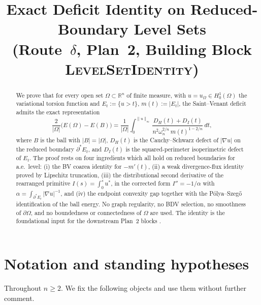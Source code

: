 \documentclass[11pt]{article}
\title{Exact Deficit Identity on Reduced-Boundary Level Sets\\
       (Route~$\delta$, Plan~2, Building Block \textsc{LevelSetIdentity})}
\author{}
\date{}
\theoremstyle{definition}
\newcommand{\R}{\mathbb{R}}
\newcommand{\Om}{\Omega}
\begin{document}
\maketitle

\begin{abstract}
We prove that for every open set $\Om\subset\R^{n}$ of finite measure, with
$u=u_{\Om}\in H^{1}_{0}(\Om)$ the variational torsion function and
$E_{t}:=\{u>t\}$, $m(t):=|E_{t}|$, the Saint--Venant deficit admits the
exact representation
\[
   \frac{2}{|\Om|}\bigl(E(\Om)-E(B)\bigr)
   =\frac{1}{|\Om|}\int_{0}^{\|u\|_{\infty}}
     \frac{D_{H}(t)+D_{I}(t)}{n^{2}\omega_{n}^{2/n}\,m(t)^{1-2/n}}\,dt,
\]
where $B$ is the ball with $|B|=|\Om|$, $D_{H}(t)$ is the Cauchy--Schwarz
defect of $|\nabla u|$ on the reduced boundary $\partial^{*}E_{t}$, and
$D_{I}(t)$ is the squared-perimeter isoperimetric defect of $E_{t}$. The
proof rests on four ingredients which all hold on reduced boundaries for
a.e.\ level: (i) the BV coarea identity for $-m'(t)$, (ii) a weak
divergence-flux identity proved by Lipschitz truncation, (iii) the
distributional second derivative of the rearranged primitive $I(s)=\int_{0}^{s}
u^{*}$, in the corrected form $I''=-1/\alpha$ with
$\alpha=\int_{\partial^{*}E_{t}}|\nabla u|^{-1}$, and (iv) the endpoint
convexity gap together with the P\'olya--Szeg\H{o} identification of the
ball energy. No graph regularity, no BDV selection, no smoothness of
$\partial\Om$, and no boundedness or connectedness of $\Om$ are used. The
identity is the foundational input for the downstream Plan~2 blocks
\cite{MetricFramework,SpaceTimeIdentity,WeightedMetricTrace,
BoundaryLayerTransfer,GlobalAssembly}.
\end{abstract}

\section{Notation and standing hypotheses}\label{sec:notation}

Throughout $n\ge 2$. We fix the following objects and use them without
further comment.
\end{document}
